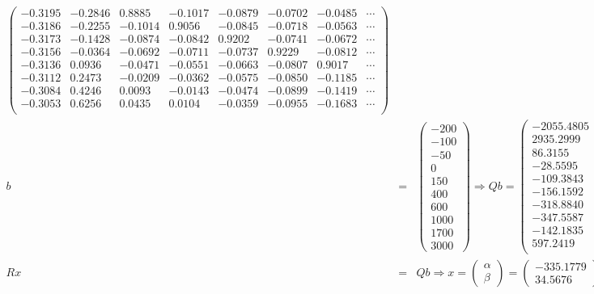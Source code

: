 \documentclass[11pt]{article} %
\begin{document}
\begin{enumerate}[a)]
\begin{eqnarray*}
\begin{pmatrix}
 -0.3195   &-0.2846  &  0.8885 &  -0.1017 &  -0.0879 &  -0.0702 &  -0.0485  &  \cdots \\
  -0.3186   &-0.2255  & -0.1014  &  0.9056 &  -0.0845 &  -0.0718  & -0.0563 &   \cdots \\
 -0.3173  & -0.1428  & -0.0874  & -0.0842  &  0.9202  & -0.0741  & -0.0672  &  \cdots \\
   -0.3156  & -0.0364 &  -0.0692 &  -0.0711 &  -0.0737  &  0.9229  & -0.0812 &  \cdots \\
   -0.3136  &  0.0936  & -0.0471  & -0.0551  & -0.0663  & -0.0807  &  0.9017  &  \cdots \\
   -0.3112   & 0.2473  & -0.0209  & -0.0362  & -0.0575  & -0.0850  & -0.1185  &  \cdots \\
   -0.3084   & 0.4246   & 0.0093  & -0.0143  & -0.0474  & -0.0899 &  -0.1419  & \cdots \\
   -0.3053   & 0.6256   & 0.0435  &  0.0104  & -0.0359  & -0.0955 &  -0.1683  &  \cdots \\
\end{pmatrix} \\
b &=& \begin{pmatrix} -200 \\ -100 \\ -50 \\ 0 \\ 150 \\ 400 \\ 600 \\ 1000 \\ 1700 \\3000 \end{pmatrix}
 \Rightarrow Qb = \begin{pmatrix} -2055.4805 \\
2935.2999\\
86.3155\\
-28.5595\\
-109.3843\\
-156.1592\\
-318.8840\\
-347.5587\\
-142.1835\\
597.2419\\
\end{pmatrix} \\
Rx &=& Qb \Rightarrow x = \begin{pmatrix} \alpha \\ \beta \end{pmatrix} =\begin{pmatrix} -335.1779 \\  34.5676 \end{pmatrix}
\end{eqnarray*}


\end{enumerate}
\end{document}
